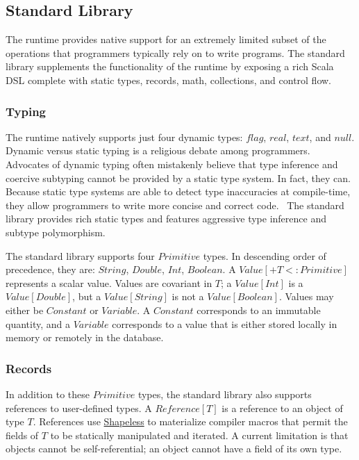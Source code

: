 \documentclass[../main.tex]{subfiles}
\begin{document}
  \subsection{Standard Library}
  The runtime provides native support for an extremely limited subset of the operations that
  programmers typically rely on to write programs. The standard library supplements the
  functionality of the runtime by exposing a rich Scala DSL complete with static types, records,
  math, collections, and control flow.

    \subsubsection{Typing}
    The runtime natively supports just four dynamic types: $flag$, $real$, $text$, and $null$.
    Dynamic versus static typing is a religious debate among programmers. Advocates of dynamic
    typing often mistakenly believe that type inference and coercive subtyping cannot be provided by
    a static type system. In fact, they can. Because static type systems are able to
    detect type inaccuracies at compile-time, they allow programmers to write more concise and
    correct code.~\cite{typing} The standard library provides rich static types and features
    aggressive type inference and subtype polymorphism.

    The standard library supports four $Primitive$ types. In descending order of precedence, they
    are: $String$, $Double$, $Int$, $Boolean$. A $Value[+T <: Primitive]$ represents a scalar value.
    Values are covariant in $T$; a $Value[Int]$ is a $Value[Double]$, but a $Value[String]$ is
    not a $Value[Boolean]$. Values may either be $Constant$ or $Variable$. A $Constant$ corresponds
    to an immutable quantity, and a $Variable$ corresponds to a value that is either stored locally
    in memory or remotely in the database.

    \subsubsection{Records}
    In addition to these $Primitive$ types, the standard library also supports references to
    user-defined types. A $Reference[T]$ is a reference to an object of type $T$. References use
    \href{https://github.com/milessabin/shapeless}{Shapeless} to materialize compiler macros that
    permit the fields of $T$ to be statically manipulated and iterated. A current limitation is that
    objects cannot be self-referential; an object cannot have a field of its own type.
\end{document}
